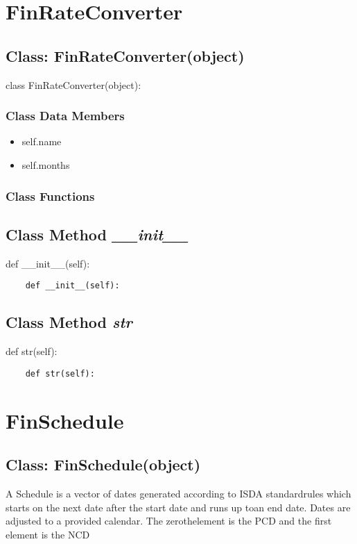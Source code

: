 \documentclass[twoside,11pt]{book}
\begin{document}
\newpage
\section{FinRateConverter}

\subsection{Class: FinRateConverter(object)}
class FinRateConverter(object):

\subsubsection{Class Data Members}
\begin{itemize}
\item{self.name}
\item{self.months}
\end{itemize}

\subsubsection{Class Functions}

\subsection{Class Method {\it \_\_init\_\_}}
def \_\_init\_\_(self):

\begin{lstlisting}
    def __init__(self):
\end{lstlisting}

\subsection{Class Method {\it str}}
def str(self):

\begin{lstlisting}
    def str(self):
\end{lstlisting}

\newpage
\section{FinSchedule}

\subsection{Class: FinSchedule(object)}
A Schedule is a vector of dates generated according to ISDA standardrules which starts on the next date after the start date and runs up toan end date. Dates are adjusted to a provided calendar. The zerothelement is the PCD and the first element is the NCD 
\end{document}
